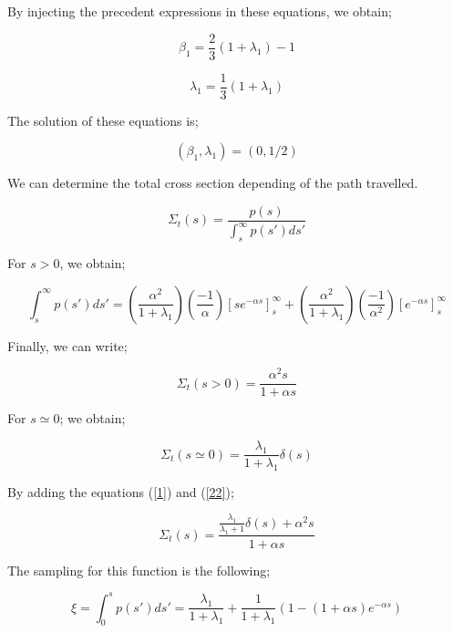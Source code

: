 \documentclass[a4paper, 12pt]{report}
\begin{document}
By injecting the precedent expressions in these equations, we obtain;

\begin{equation}
\beta_1 = \frac{2}{3}(1+\lambda_1) - 1
\end{equation}

\begin{equation}
\lambda_1 = \frac{1}{3}(1+\lambda_1) 
\end{equation}

The solution of these equations is;

\begin{equation}
(\beta_1,\lambda_1) = (0,1/2)
\end{equation}

We can determine the total cross section depending of the path travelled.

\begin{equation}
\Sigma_t(s) = \frac{p(s)}{\int_s^\infty p(s') ds'}
\end{equation}

For $s>0$, we obtain;

\begin{equation}
\int_s^\infty p(s')ds' = \left(\frac{\alpha^2}{1+\lambda_1}\right)\left(\frac{-1}{\alpha}\right)\left[se^{-\alpha s}\right]_s^\infty + \left(\frac{\alpha^2}{1+\lambda_1}\right)\left(\frac{-1}{\alpha^2}\right)\left[e^{-\alpha s}\right]_s^\infty 
\end{equation}

Finally, we can write;

\begin{equation}\label{1}
\Sigma_t(s>0) = \frac{\alpha^2s}{1+\alpha s}
\end{equation}

For $s \simeq 0$; we obtain;

\begin{equation}\label{22}
\Sigma_t(s\simeq 0) = \frac{\lambda_1}{1+\lambda_1}\delta(s)
\end{equation}

By adding the equations (\ref{1}) and (\ref{22});

\begin{equation}
\Sigma_t(s) = \frac{\frac{\lambda_1}{\lambda_1 + 1}\delta(s) + \alpha^2 s}{1+\alpha s}
\end{equation}

The sampling for this function is the following;

\begin{equation}
\xi = \int_0^s p(s')ds' = \frac{\lambda_1}{1+\lambda_1} + \frac{1}{1+\lambda_1}\left(1-(1+\alpha s)e^{-\alpha s}\right)
\end{equation}
\end{document}
